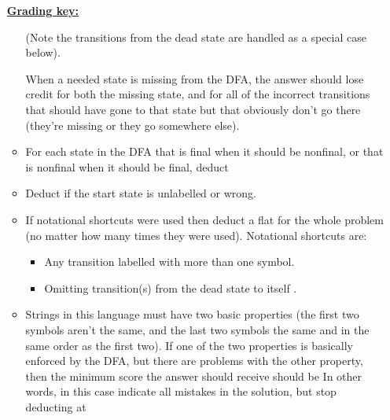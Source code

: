 \documentclass[11pt,fleqn]{article}
\begin{document}
\begin{enumerate}
\begin{info}{\textbf{\underline{Grading key:}}}
\begin{itemize}
                    (Note the transitions from the dead state are handled as
                    a special case below).

                    When a needed state is missing from the DFA, the answer
                    should lose credit for both the missing state, and for
                    all of the incorrect transitions that should have gone
                    to that state but that obviously don't go there
                    (they're missing or they go somewhere else).

              \item For each state in the DFA that is final when it should
                    be nonfinal, or that is nonfinal when it should be
                    final, deduct 

              \item Deduct  if the start state is unlabelled
                    or wrong.

              \item If notational shortcuts were used then deduct a flat
                     for the whole problem (no matter how
                    many times they were used).  Notational shortcuts are:

                    \medskip

                    \begin{itemize}

                      \item Any transition labelled with more than one
                            symbol.

                      \item Omitting transition(s) from the dead state to
                            itself%
                            .

                    \end{itemize}

                    \vspace{-.75mm}

              \item Strings in this language must have two basic properties
                    (the first two symbols aren't the same, and the last two
                    symbols the same and in the same order as the first
                    two).  If one of the two properties is basically
                    enforced by the DFA, but there are problems with the
                    other property, then the minimum score the answer should
                    receive should be   In other words, in this case
                    indicate all mistakes in the solution, but stop
                    deducting at 


\end{itemize}
\end{info}
\end{enumerate}
\end{document}
